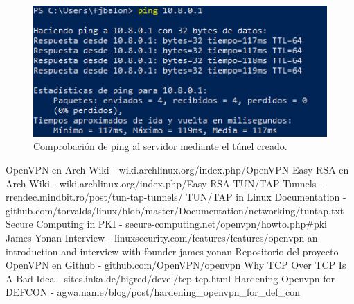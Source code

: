 \documentclass[a4paper, 11pt, titlepage]{article}
\begin{document}
        \begin{figure}[htp]
            \centering
            \includegraphics[width=1\textwidth]{resources/windows12.png}
            \caption{Comprobación de ping al servidor mediante el túnel creado.}
            \label{fig:windows12}
        \end{figure}  


\newpage
\begin{thebibliography}{X}
    \bibitem{} OpenVPN en Arch Wiki - wiki.archlinux.org/index.php/OpenVPN
    \bibitem{} Easy-RSA en Arch Wiki - wiki.archlinux.org/index.php/Easy-RSA
    \bibitem{} TUN/TAP Tunnels - rrendec.mindbit.ro/post/tun-tap-tunnels/
    \bibitem{} TUN/TAP in Linux Documentation - github.com/torvalds/linux/blob/master/Documentation/networking/tuntap.txt
    \bibitem{} Secure Computing in PKI - secure-computing.net/openvpn/howto.php\#pki
    \bibitem{} James Yonan Interview - linuxsecurity.com/features/features/openvpn-an-introduction-and-interview-with-founder-james-yonan
    \bibitem{} Repositorio del proyecto OpenVPN en Github - github.com/OpenVPN/openvpn
    \bibitem{} Why TCP Over TCP Is A Bad Idea - sites.inka.de/bigred/devel/tcp-tcp.html
    \bibitem{} Hardening Openvpn for DEFCON - agwa.name/blog/post/hardening\_openvpn\_for\_def\_con
\end{thebibliography}
\end{document}
